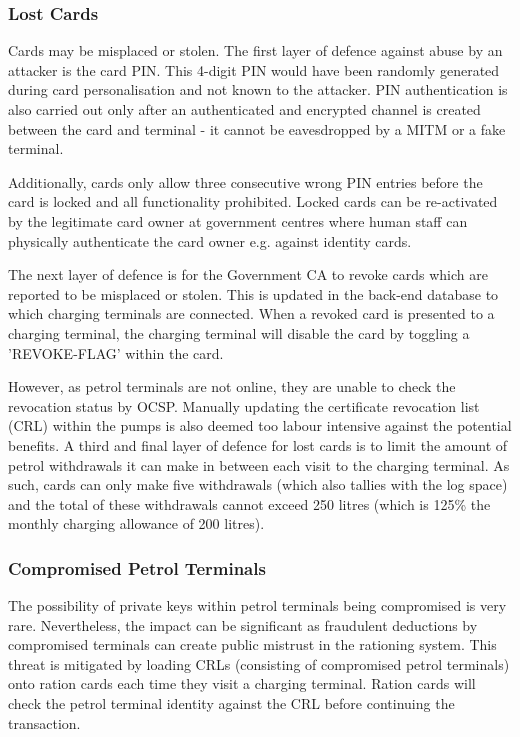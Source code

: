 \subsubsection{Lost Cards}
Cards may be misplaced or stolen. The first layer of defence against abuse by an attacker is the card PIN. This 4-digit PIN would have been randomly generated during card personalisation and not known to the attacker. PIN authentication is also carried out only after an authenticated and encrypted channel is created between the card and terminal - it cannot be eavesdropped by a MITM or a fake terminal. 

Additionally, cards only allow three consecutive wrong PIN entries before the card is locked and all functionality prohibited. Locked cards can be re-activated by the legitimate card owner at government centres where human staff can physically authenticate the card owner e.g. against identity cards.

The next layer of defence is for the Government CA to revoke cards which are reported to be misplaced or stolen. This is updated in the back-end database to which charging terminals are connected. When a revoked card is presented to a charging terminal, the charging terminal will disable the card by toggling a 'REVOKE-FLAG' within the card.

However, as petrol terminals are not online, they are unable to check the revocation status by OCSP. Manually updating the certificate revocation list (CRL) within the pumps is also deemed too labour intensive against the potential benefits. A third and final layer of defence for lost cards is to limit the amount of petrol withdrawals it can make in between each visit to the charging terminal. As such, cards can only make five withdrawals (which also tallies with the log space) and the total of these withdrawals cannot exceed 250 litres (which is 125\% the monthly charging allowance of 200 litres).

\subsubsection{Compromised Petrol Terminals}
The possibility of private keys within petrol terminals being compromised is very rare. Nevertheless, the impact can be significant as fraudulent deductions by compromised terminals can create public mistrust in the rationing system. This threat is mitigated by loading CRLs (consisting of compromised petrol terminals) onto ration cards each time they visit a charging terminal. Ration cards will check the petrol terminal identity against the CRL before continuing the transaction.